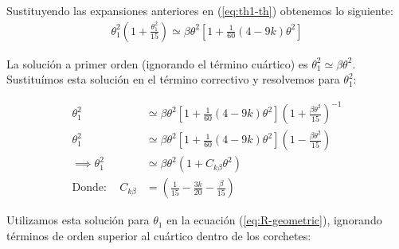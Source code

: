 Sustituyendo las expansiones anteriores en (\ref{eq:th1-th}) obtenemos lo siguiente:
\begin{align}
  \theta^2_1\left(1 + \frac{\theta^2_1}{15}\right) \simeq \beta\theta^2\left[1 + \frac{1}{60}\left(4 - 9k\right)\theta^2\right]
  \label{eq:th1-th-approx}
\end{align}

La solución a primer orden (ignorando el término cuártico) es $\theta^2_ 1 \simeq \beta\theta^2$. Sustituímos esta solución en el
término correctivo y resolvemos para $\theta^2_1$:

\begin{align}
  \theta^2_1 &\simeq \beta\theta^2\left[1 + \frac{1}{60}\left(4 - 9k\right)\theta^2\right]\left(1 + \frac{\beta\theta^2}{15}\right)^{-1} \\
  \theta^2_1 &\simeq \beta\theta^2\left[1 + \frac{1}{60}\left(4 - 9k\right)\theta^2\right]\left(1 - \frac{\beta\theta^2}{15}\right) \\
  \implies \theta^2_1 &\simeq \beta\theta^2\left(1 + C_{k\beta}\theta^2\right) \\
  \mathrm{Donde:\quad}C_{k\beta} &= \left(\frac{1}{15} - \frac{3k}{20} - \frac{\beta}{15}\right)
\end{align}

Utilizamos esta solución para $\theta_1$ en la ecuación (\ref{eq:R-geometric}), ignorando términos de orden superior al cuártico
dentro de los corchetes:

